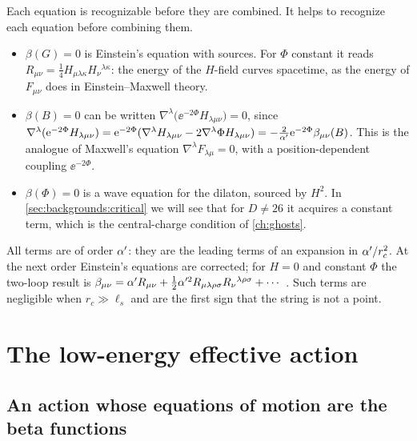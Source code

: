 Each equation is recognizable before they are combined.
It helps to recognize each equation before combining them.
\begin{itemize}[leftmargin=*,itemsep=2pt]
\item $\beta(G)=0$ is Einstein's equation with sources. For $\Phi$ constant it reads
  $R_{\mu\nu}=\tfrac14H_{\mu\lambda\kappa}H_\nu{}^{\lambda\kappa}$: the energy of the
  $H$-field curves spacetime, as the energy of $F_{\mu\nu}$ does in Einstein--Maxwell theory.
\item $\beta(B)=0$ can be written
  $\nabla^\lambda\bigl(\ee^{-2\Phi}H_{\lambda\mu\nu}\bigr)=0$, since
  $\nabla^\lambda(\mathrm{e}^{-2\Phi}H_{\lambda\mu\nu})=\mathrm{e}^{-2\Phi}(\nabla^\lambda H_{\lambda\mu\nu}
  -2\nabla^\lambda\Phi H_{\lambda\mu\nu})=-\tfrac{2}{\alpha'}\mathrm{e}^{-2\Phi}\beta_{\mu\nu}(B)$. This is
  the analogue of Maxwell's equation $\nabla^\lambda F_{\lambda\mu}=0$, with a
  position-dependent coupling $\ee^{-2\Phi}$.
\item $\beta(\Phi)=0$ is a wave equation for the dilaton, sourced by $H^2$. In
  \cref{sec:backgrounds:critical} we will see that for $D\neq26$ it acquires a constant term,
  which is the central-charge condition of \cref{ch:ghosts}.
\end{itemize}
All terms are of order $\alpha'$: they are the leading terms of an expansion in $\alpha'/r_c^2$. At
the next order Einstein's equations are corrected; for $H=0$ and constant $\Phi$ the two-loop
result is $\beta_{\mu\nu}=\alpha' R_{\mu\nu}+\tfrac12\alpha'^2R_{\mu\lambda\rho\sigma}
R_\nu{}^{\lambda\rho\sigma}+\cdots$ . Such terms are
negligible when $r_c\gg\ell_s$ and are the first sign that the string is not a point.

\section{The low-energy effective action}\label{sec:backgrounds:action}

\subsection{An action whose equations of motion are the beta functions}

